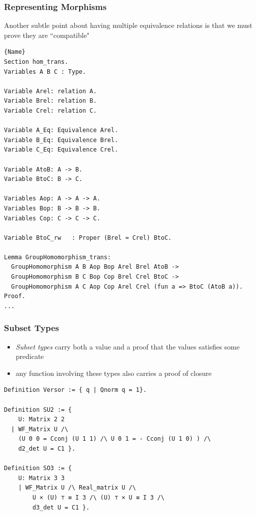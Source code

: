 \documentclass{beamer}
\begin{document}
\begin{frame}[fragile]
\frametitle{Representing Morphisms}

Another subtle point about having multiple equivalence relations is that we must prove they are ``compatible"

\begin{lstlisting}[language=Coq, basicstyle=\tiny]{Name}
Section hom_trans.
Variables A B C : Type.

Variable Arel: relation A.
Variable Brel: relation B.
Variable Crel: relation C.

Variable A_Eq: Equivalence Arel.
Variable B_Eq: Equivalence Brel.
Variable C_Eq: Equivalence Crel.

Variable AtoB: A -> B.
Variable BtoC: B -> C.

Variables Aop: A -> A -> A.
Variables Bop: B -> B -> B.
Variables Cop: C -> C -> C.

Variable BtoC_rw   : Proper (Brel ≈ Crel) BtoC.

Lemma GroupHomomorphism_trans:
  GroupHomomorphism A B Aop Bop Arel Brel AtoB ->
  GroupHomomorphism B C Bop Cop Brel Crel BtoC ->
  GroupHomomorphism A C Aop Cop Arel Crel (fun a => BtoC (AtoB a)).
Proof.
...
\end{lstlisting}

\end{frame}


\begin{frame}[fragile]
\frametitle{Subset Types}

\begin{itemize}
	\item \textit{Subset types} carry both a value and a proof that the values satisfies some predicate
	\item any function involving these types also carries a proof of closure
\end{itemize}

\begin{lstlisting}[language=Coq]
Definition Versor := { q | Qnorm q = 1}.

Definition SU2 := { 
	U: Matrix 2 2
  | WF_Matrix U /\                                                                               
    (U 0 0 = Cconj (U 1 1) /\ U 0 1 = - Cconj (U 1 0) ) /\
    d2_det U = C1 }.

Definition SO3 := { 
	U: Matrix 3 3 
	| WF_Matrix U /\ Real_matrix U /\ 
		U × (U) ⊤ ≡ I 3 /\ (U) ⊤ × U ≡ I 3 /\ 
		d3_det U = C1 }. 
\end{lstlisting}
\end{frame}
\end{document}
